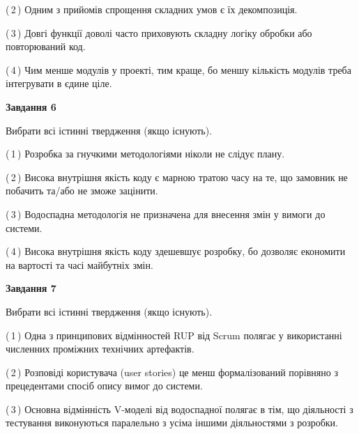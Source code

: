 \documentclass[10pt, ukrainian]{article}
\begin{document}
{\begin {large}
(\,2\,) Одним з прийомів спрощення складних умов є їх декомпозиція. %



(\,3\,) Довгі функції доволі часто приховують складну логіку обробки або повторюваний код. %



(\,4\,) Чим менше модулів у проекті, тим краще, бо меншу кількість модулів треба інтегрувати в єдине ціле. %

\newpage

{\begin {center}\textbf{Завдання 6}\end {center}}\par
Вибрати всі істинні твердження (якщо існують).\par
\vspace{2mm}



(\,1\,) Розробка за гнучкими методологіями ніколи не слідує плану. %



(\,2\,) Висока внутрішня якість коду є марною тратою часу на те, що замовник не побачить та/або не зможе зацінити. %



(\,3\,) Водоспадна методологія не призначена для внесення змін у вимоги до системи. %



(\,4\,) Висока внутрішня якість коду здешевшує розробку, бо дозволяє економити на вартості та часі майбутніх змін. %


{\begin {center}\textbf{Завдання 7}\end {center}}\par
Вибрати всі істинні твердження (якщо існують).\par
\vspace{2mm}



(\,1\,) Одна з принципових відмінностей RUP від Scrum полягає у використанні численних проміжних технічних артефактів. %



(\,2\,) Розповіді користувача (user stories) це менш формалізований порівняно з прецедентами спосіб опису вимог до системи. %



(\,3\,) Основна відмінність V-моделі від водоспадної полягає в тім, що діяльності з тестування виконуються паралельно з усіма іншими діяльностями з розробки. %




\end{large}}
\end{document}
